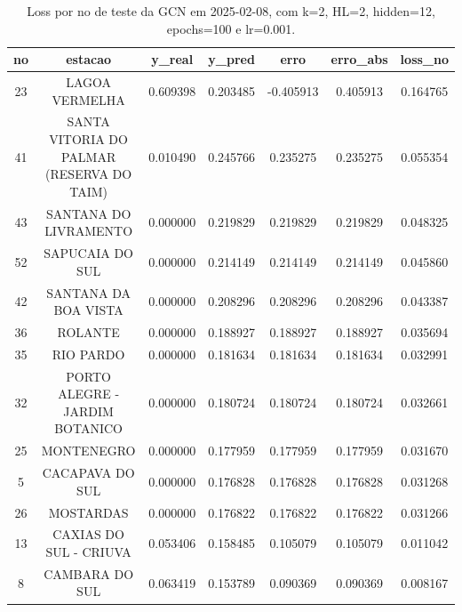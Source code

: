\begin{table}[h]
\centering
\caption{Loss por no de teste da GCN em 2025-02-08, com k=2, HL=2, hidden=12, epochs=100 e lr=0.001.}
\label{tab:gcn_loss_k2_hl2_h12_e100_d20250208}
\begin{tabular}{ccccccc}
\toprule
no & estacao & y\_real & y\_pred & erro & erro\_abs & loss\_no \\
\midrule
23 & LAGOA VERMELHA & 0.609398 & 0.203485 & -0.405913 & 0.405913 & 0.164765 \\
41 & SANTA VITORIA DO PALMAR (RESERVA DO TAIM) & 0.010490 & 0.245766 & 0.235275 & 0.235275 & 0.055354 \\
43 & SANTANA DO LIVRAMENTO & 0.000000 & 0.219829 & 0.219829 & 0.219829 & 0.048325 \\
52 & SAPUCAIA DO SUL & 0.000000 & 0.214149 & 0.214149 & 0.214149 & 0.045860 \\
42 & SANTANA DA BOA VISTA & 0.000000 & 0.208296 & 0.208296 & 0.208296 & 0.043387 \\
36 & ROLANTE & 0.000000 & 0.188927 & 0.188927 & 0.188927 & 0.035694 \\
35 & RIO PARDO & 0.000000 & 0.181634 & 0.181634 & 0.181634 & 0.032991 \\
32 & PORTO ALEGRE - JARDIM BOTANICO & 0.000000 & 0.180724 & 0.180724 & 0.180724 & 0.032661 \\
25 & MONTENEGRO & 0.000000 & 0.177959 & 0.177959 & 0.177959 & 0.031670 \\
5 & CACAPAVA DO SUL & 0.000000 & 0.176828 & 0.176828 & 0.176828 & 0.031268 \\
26 & MOSTARDAS & 0.000000 & 0.176822 & 0.176822 & 0.176822 & 0.031266 \\
13 & CAXIAS DO SUL - CRIUVA & 0.053406 & 0.158485 & 0.105079 & 0.105079 & 0.011042 \\
8 & CAMBARA DO SUL & 0.063419 & 0.153789 & 0.090369 & 0.090369 & 0.008167 \\
\bottomrule
\end{tabular}
\end{table}
